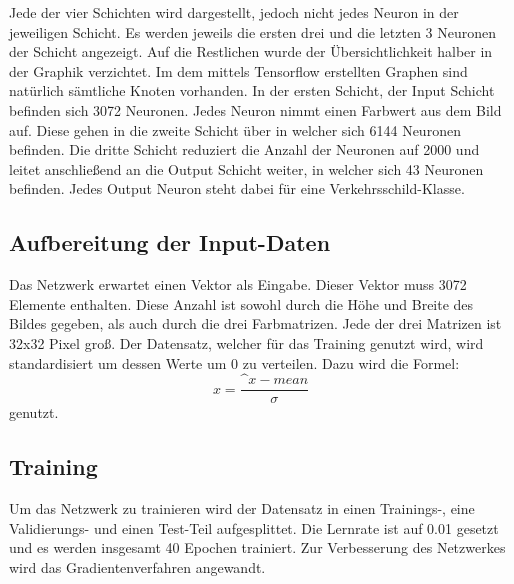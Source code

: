 Jede der vier Schichten wird dargestellt, jedoch nicht jedes Neuron in der jeweiligen Schicht. Es werden jeweils die ersten drei 
und die letzten 3 Neuronen der Schicht angezeigt. Auf die Restlichen wurde der Übersichtlichkeit halber in der Graphik verzichtet.
Im dem mittels Tensorflow erstellten Graphen sind natürlich sämtliche Knoten vorhanden. 
In der ersten Schicht, der Input Schicht befinden sich 3072 Neuronen. Jedes Neuron nimmt einen Farbwert aus dem Bild auf. 
Diese gehen in die zweite Schicht über in welcher sich 6144 Neuronen befinden. Die dritte Schicht reduziert die Anzahl der Neuronen 
auf 2000 und leitet anschließend an die Output Schicht weiter, in welcher sich 43 Neuronen befinden. Jedes Output Neuron steht dabei 
für eine Verkehrsschild-Klasse. 

\subsection{Aufbereitung der Input-Daten}
Das Netzwerk erwartet einen Vektor als Eingabe. Dieser Vektor muss 3072 Elemente enthalten. Diese Anzahl ist sowohl durch die Höhe 
und Breite des Bildes gegeben, als auch durch die drei Farbmatrizen. Jede der drei Matrizen ist 32x32 Pixel groß. 
Der Datensatz, welcher für das Training genutzt wird, wird standardisiert um dessen Werte um 0 zu verteilen. 
Dazu wird die Formel: 
\begin{equation}
    x = \frac{\^{x} - mean}{\sigma}
\end{equation}
genutzt.

\subsection{Training}
Um das Netzwerk zu trainieren wird der Datensatz in einen Trainings-, eine Validierungs- und einen Test-Teil aufgesplittet. 
Die Lernrate ist auf 0.01 gesetzt und es werden insgesamt 40 Epochen trainiert. Zur Verbesserung des Netzwerkes wird das 
Gradientenverfahren angewandt. 